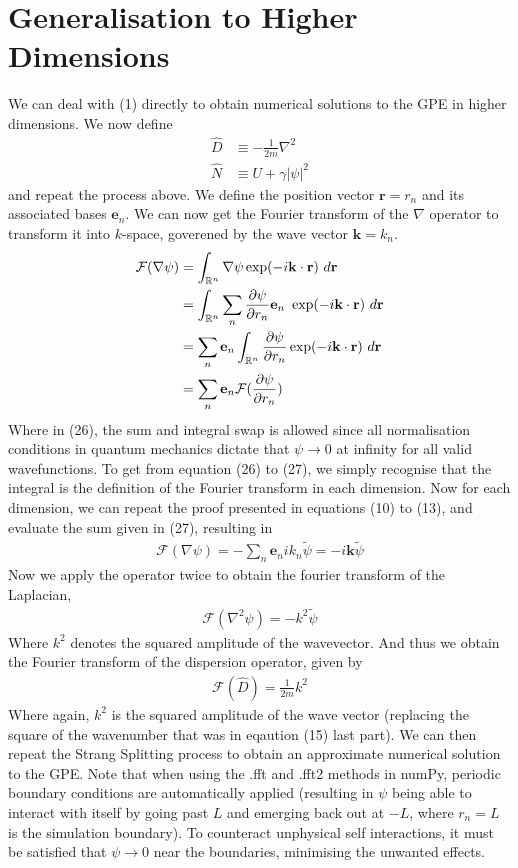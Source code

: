 \documentclass{article}
\newcommand{\ve}{\mathbf}
\begin{document}
\section{Generalisation to Higher Dimensions}
We can deal with (1) directly to obtain numerical solutions to the GPE in higher dimensions. 
We now define 
\begin{align}
    \hat{D}&\equiv -\frac{1}{2m}\nabla^2\\ 
    \hat{N}&\equiv U+\gamma|\psi|^2
\end{align}
and repeat the process above. We define the position vector 
$\ve{r}=r_n$ and its associated bases $\ve{e}_n$. We can now get the Fourier
 transform of the $\nabla$ operator to transform it into $k$-space, 
 goverened by the wave vector $\ve{k}=k_n$.
\begin{align}
    \mathcal{F}(\nabla\psi) &= \int_{\mathbb{R}^n}\nabla\psi\exp(-i\ve{k}\cdot \ve{r})\ d\ve{r}\\ 
    &=\int_{\mathbb{R}^n}\sum_n\pdv{\psi}{r_n} \ve{e}_n\ \exp(-i\ve{k}\cdot \ve{r})\ d\ve{r}\\ 
    &= \sum_n\ve{e}_n \int_{\mathbb{R}^n}\pdv{\psi}{r_n}\exp(-i\ve{k}\cdot \ve{r})\ d\ve{r}\\
    &=\sum_n\ve{e}_n\mathcal{F}(\pdv{\psi}{r_n})
\end{align}
Where in (26), the sum and integral swap is allowed since
all normalisation conditions in quantum mechanics 
dictate that $\psi\to0$ at infinity for all valid wavefunctions. To get from equation (26) to (27), we simply recognise that 
the integral is the definition of the Fourier transform in each dimension.
 Now for each dimension, 
we can repeat the proof presented in equations (10) to (13), and evaluate the sum given in (27), resulting in 
\begin{align}
    \mathcal{F}(\nabla\psi)=-\sum_n\ve{e}_nik_n\tilde{\psi}=-i\ve{k}\tilde{\psi}
\end{align}
Now we apply the operator twice to obtain the fourier transform of the Laplacian, 
\begin{align}
    \mathcal{F}(\nabla^2\psi)=-k^2\tilde{\psi}
\end{align}
Where $k^2$ denotes the squared amplitude of the wavevector. And thus we obtain the Fourier transform 
of the dispersion operator, given by 
\begin{align}
    \mathcal{F}(\hat{D})=\frac{1}{2m}k^2
\end{align}
Where again, $k^2$ is the squared amplitude of the wave vector (replacing the square of the wavenumber that was in eqaution 
(15) last part). We can then repeat the Strang Splitting process to obtain an approximate numerical solution to the 
GPE. Note that when using the .fft and .fft2 methods in numPy, periodic boundary 
conditions are automatically applied (resulting in $\psi$ being able to interact with itself by going 
past $L$ and emerging back out at $-L$, where $r_n=L$ is the simulation boundary). 
To counteract unphysical self interactions, it must be satisfied that $\psi\to0$ 
near the boundaries, minimising the unwanted effects. 
\newpage
\end{document}
